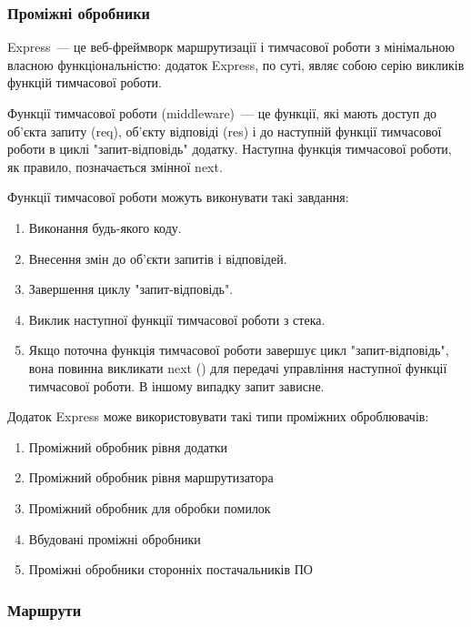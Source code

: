 \subsubsection{Проміжні обробники} \label{subs:middleware}

Express~--- це веб-фреймворк маршрутизації і тимчасової роботи з мінімальною власною функціональністю: додаток Express, по суті, являє собою серію викликів функцій тимчасової роботи.

Функції тимчасової роботи (middleware)~--- це функції, які мають доступ до об'єкта запиту (req), об'єкту відповіді (res) і до наступній функції тимчасової роботи в циклі "запит-відповідь" додатку. Наступна функція тимчасової роботи, як правило, позначається змінної next.

Функції тимчасової роботи можуть виконувати такі завдання:

\begin{enumerate}
	\item Виконання будь-якого коду.
	\item Внесення змін до об'єкти запитів і відповідей.
	\item Завершення циклу "запит-відповідь".
	\item Виклик наступної функції тимчасової роботи з стека.
	\item Якщо поточна функція тимчасової роботи завершує цикл "запит-відповідь", вона повинна викликати next () для передачі управління наступної функції тимчасової роботи. В іншому випадку запит зависне.
\end{enumerate}	

Додаток Express може використовувати такі типи проміжних оброблювачів:

\begin{enumerate}
	\item Проміжний обробник рівня додатки
	\item Проміжний обробник рівня маршрутизатора
	\item Проміжний обробник для обробки помилок
	\item Вбудовані проміжні обробники
	\item Проміжні обробники сторонніх постачальників ПО
\end{enumerate}	


\subsubsection{Маршрути}


